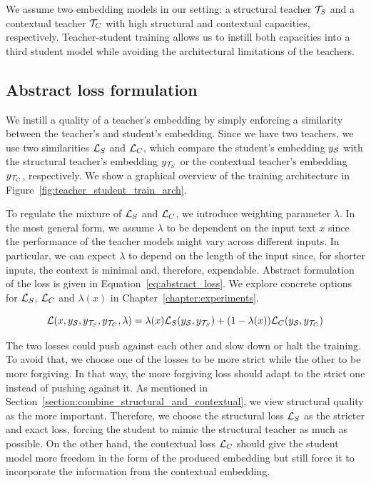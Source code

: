 We assume two embedding models in our setting: a structural teacher
$\mathcal{T}_S$ and a contextual teacher $\mathcal{T}_C$ with high structural and
contextual capacities, respectively. Teacher-student training allows us to
instill both capacities into a third student model {\Student} while avoiding
the architectural limitations of the teachers.


\subsection{Abstract loss formulation}\label{section:abstract_loss}


We instill a quality of a teacher's embedding by simply enforcing a similarity
between the teacher's and student's embedding. Since we have two teachers, we
use two similarities $\mathcal{L}_S$ and $\mathcal{L}_C$, which compare the student's
embedding $y_{\mathcal{S}}$ with the structural teacher's embedding $y_{\mathcal{T}_S}$
or the contextual teacher's embedding $y_{\mathcal{T}_C}$, respectively. We show
a graphical overview of the training architecture in
Figure~\ref{fig:teacher_student_train_arch}.

To regulate the mixture of $\mathcal{L}_S$ and $\mathcal{L}_C$, we introduce weighting
parameter $\lambda$. In the most general form, we assume $\lambda$ to be
dependent on the input text $x$ since the performance of the teacher models
might vary across different inputs. In particular, we can expect $\lambda$ to
depend on the length of the input since, for shorter inputs, the context
is minimal and, therefore, expendable. Abstract formulation of the loss is
given in Equation~\ref{eq:abstract_loss}. We explore concrete options for
$\mathcal{L}_S$, $\mathcal{L}_C$ and $\lambda(x)$ in Chapter~\ref{chapter:experiments}.

\begin{equation}\label{eq:abstract_loss}
  \mathcal{L}(
    x,
    y_{\mathcal{S}},
    y_{\mathcal{T}_S},
    y_{\mathcal{T}_C},
    \lambda
  ) =
    \lambda(x) \mathcal{L}_S(y_{\mathcal{S}}, y_{\mathcal{T}_S}) +
            (1 - \lambda(x)) \mathcal{L}_C(y_{\mathcal{S}}, y_{\mathcal{T}_C})
\end{equation}

The two losses could push against each other and slow down or halt the
training. To avoid that, we choose one of the losses to be more strict while
the other to be more forgiving. In that way, the more forgiving loss should
adapt to the strict one instead of pushing against it. As mentioned in
Section~\ref{section:combine_structural_and_contextual}, we view structural
quality as the more important. Therefore, we choose the structural loss
$\mathcal{L}_S$ as the stricter and exact loss, forcing the student to mimic the
structural teacher as much as possible. On the other hand, the contextual loss
$\mathcal{L}_C$ should give the student model more freedom in the form of the
produced embedding but still force it to incorporate the information from the
contextual embedding.

